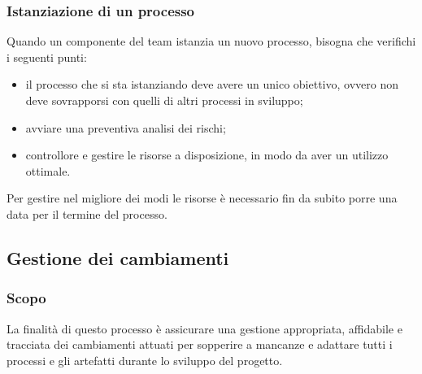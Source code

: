 \subsubsection{Istanziazione di un processo}
Quando un componente del team istanzia un nuovo processo, bisogna che verifichi i seguenti punti:
\begin{itemize}
    \item il processo che si sta istanziando deve avere un unico obiettivo, ovvero non deve sovrapporsi con quelli di altri processi in sviluppo;
    \item avviare una preventiva analisi dei rischi;
    \item controllore e gestire le risorse a disposizione, in modo da aver un utilizzo ottimale.
\end{itemize}
Per gestire nel migliore dei modi le risorse è necessario fin da subito porre una data per il termine del processo.

\subsection{Gestione dei cambiamenti} \label{_gestioneDeiCambiamenti}
\subsubsection{Scopo}
La finalità di questo processo è assicurare una gestione appropriata, affidabile e tracciata
dei cambiamenti attuati per sopperire a mancanze e adattare tutti i processi e gli artefatti durante lo sviluppo del progetto.

